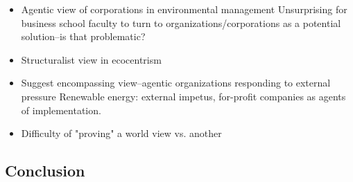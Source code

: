\documentclass{article}
\begin{document}

	\begin{itemize}
		\item Agentic view of corporations in environmental management
			\subitem Unsurprising for business school faculty to turn to organizations/corporations as a potential solution--is that problematic?
		\item Structuralist view in ecocentrism
		\item Suggest encompassing view--agentic organizations responding to external pressure
			\subitem Renewable energy: external impetus, for-profit companies as agents of implementation.
		\item Difficulty of "proving" a world view vs. another
			\subitem \citet{Giddens1979}
	\end{itemize}

	\subsection*{Conclusion}
\end{document}
